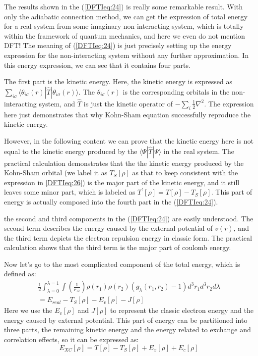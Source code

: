 The results shown in the (\ref{DFTIeq:24}) is really some remarkable
result. With only the adiabatic connection method, we can get the
expression of total energy for a real system from some imaginary
non-interacting system, which is totally within the framework of
quantum mechanics, and here we even do not mention DFT! The meaning
of (\ref{DFTIeq:24}) is just precisely setting up the energy
expression for the non-interacting system without any further
approximation. In this energy expression, we can see that it
contains four parts.

The first part is the kinetic energy. Here, the kinetic energy is
expressed as
$\sum_{i\sigma}\langle\theta_{i\sigma}(r)|\hat{T}|\theta_{i\sigma}
(r)\rangle$. The $\theta_{i\sigma}(r)$ is the corresponding orbitals
in the non-interacting system, and $\hat{T}$ is just the kinetic
operator of $-\sum_{i}\frac{1}{2}\nabla^{2}$. The expression here
just demonstrates that why Kohn-Sham equation successfully reproduce
the kinetic energy.

However, in the following content we can prove that the kinetic
energy here is not equal to the kinetic energy produced by the
$\langle\Psi|\hat{T}|\Psi\rangle$ in the real system. The practical
calculation demonstrates that the the kinetic energy produced by the
Kohn-Sham orbital (we label it as $T_{S}[\rho]$ as that to keep
consistent with the expression in \ref{DFTIeq:26}) is the major part
of the kinetic energy, and it still leaves some minor part, which is
labeled as $T^{'}[\rho] = T[\rho] - T_{S}[\rho]$. This part of
energy is actually composed into the fourth part in the
(\ref{DFTIeq:24}).

the second and third components in the (\ref{DFTIeq:24}) are easily
understood. The second term describes the energy caused by the
external potential of $v(r)$, and the third term depicts the
electron repulsion energy in classic form. The practical calculation
shows that the third term is the major part of coulomb energy.

Now let's go to the most complicated component of the total energy,
which is defined as:
\begin{multline}\label{}
\frac{1}{2}\int^{\lambda = 1}_{\lambda = 0} \int
\left(\frac{1}{r_{12}}\right)
\rho(r_{1})\rho(r_{2})(g_{\lambda}(r_{1},
r_{2})-1)d^{3}r_{1}d^{3}r_{2} d\lambda \\
= E_{real} - T_{S}[\rho] -
E_{v}[\rho] -J[\rho]
\end{multline}
Here we use the $E_{v}[\rho]$ and $J[\rho]$ to represent the classic
electron energy and the energy caused by external potential. This
part of energy can be partitioned into three parts, the remaining
kinetic energy and the energy related to exchange and correlation
effects, so it can be expressed as:
\begin{equation}\label{}
E_{XC}[\rho] = T[\rho] - T_{S}[\rho] + E_{x}[\rho] + E_{c}[\rho]
\end{equation}




